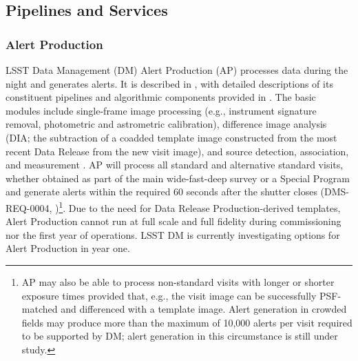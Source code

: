 \subsection{Pipelines and Services}

\subsubsection{Alert Production}\label{sec:AP}

LSST Data Management (DM) Alert Production (AP) processes data during the night and generates alerts.
It is described in , with detailed descriptions of its constituent pipelines and algorithmic components provided in .
The basic modules include single-frame image processing (e.g., instrument signature removal, photometric and astrometric calibration), difference image analysis (DIA; the subtraction of a coadded template image constructed from the most recent Data Release from the new visit image), and source detection, association, and measurement .
AP will process all standard and alternative standard visits, whether obtained as part of the main wide-fast-deep survey or a Special Program  and generate alerts within the required 60 seconds after the shutter closes (DMS-REQ-0004, )\footnote{
AP may also be able to process non-standard visits with longer or shorter exposure times provided that, e.g., the visit image can be successfully PSF-matched and differenced with a template image.
Alert generation in crowded fields may produce more than the maximum of 10,000 alerts per visit required to be supported by DM; alert generation in this circumstance is still under study.
}.
Due to the need for Data Release Production-derived templates, Alert Production cannot run at full scale and full fidelity during commissioning nor the first year of operations.  LSST DM is currently investigating options for Alert Production in year one.


